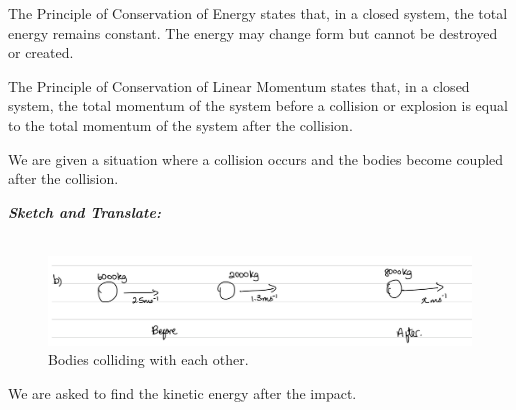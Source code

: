 %
%
%


\begin{subquestions}

\subquestion

\begin{subsubquestions}
	
\subsubquestion

The Principle of Conservation of Energy states that, in a closed system, the total energy remains constant. The energy may change form but cannot be destroyed or created.

\subsubquestion

The Principle of Conservation of Linear Momentum states that, in a closed system, the total momentum of the system before a collision or explosion is equal to the total momentum of the system after the collision. 

\end{subsubquestions}


\begin{subsubquestions}
	
\subsubquestion

We are given a situation where a collision occurs and the bodies become coupled after the collision.

\textbf{\textit{Sketch and Translate:}} \\ \\
\begin{figure}[H]
	\begin{center}
		\includegraphics[scale=0.25]{../2008/figures/2008Jq5-1}
		\caption{\label{2008J:q5:Sketch1} Bodies colliding with each other.}
	\end{center}
\end{figure}	
We are asked to find the kinetic energy after the impact.  




\end{subsubquestions}
\end{subquestions}
